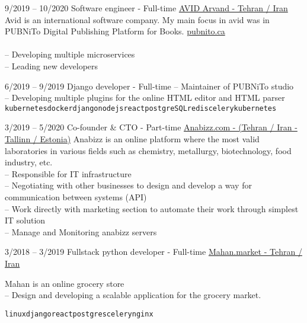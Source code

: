 \documentclass[9pt]{developercv}
\begin{document}
\begin{entrylist}
	\entry
	{9/2019 -- 10/2020}
	{Software engineer - Full-time}
	{
		\href{https://www.linkedin.com/company/avid-technology-development/}{AVID Arvand - Tehran / Iran}}
	{ Avid is an international software company. My main focus in avid was in PUBNiTo Digital Publishing Platform for Books.	 \href{https://pubnito.ca/}{pubnito.ca}\\ \\
		-- Developing multiple microservices \\
		-- Leading new developers }
\end{entrylist}
\begin{entrylist}
	\entry
	{6/2019 -- 9/2019}
	{Django developer - Full-time}
	{ }
	{-- Maintainer of PUBNiTo studio \\
		-- Developing multiple plugins for the online HTML editor and HTML parser  \\

		\texttt{kubernetes}\slashsep\texttt{docker}\slashsep\texttt{django}\slashsep\texttt{nodejs}\slashsep\texttt{react}\slashsep\texttt{postgreSQL}\slashsep\texttt{redis}\slashsep\texttt{celery}\slashsep\texttt{kubernetes}}
\end{entrylist}
\begin{entrylist}
	\entry
	{3/2019 -- 5/2020}
	{Co-founder \& CTO - Part-time}
	{\href{https://www.e-krediidiinfo.ee/16152752-ANABIZZ OÜ}{Anabizz.com - (Tehran / Iran - Tallinn / Estonia)}}
	{Anabizz is an online platform where the most valid laboratories in various fields such as chemistry, metallurgy, biotechnology, food industry, etc. \\
		-- Responsible for IT infrastructure  \\
		-- Negotiating with other businesses to design and develop a way for communication between systems (API) \\
		-- Work directly with marketing section to automate their work through simplest IT solution \\
		-- Manage and Monitoring anabizz servers \\
	}
\end{entrylist}

\begin{entrylist}
	\entry
	{3/2018 -- 3/2019}
	{Fullstack python developer - Full-time}
	{\href{https://mahan.market/}{Mahan.market - Tehran / Iran}}
	{Mahan is an online grocery store \\
		-- Design and developing a scalable application for the grocery market.

		\texttt{linux}\slashsep\texttt{django}\slashsep\texttt{react}\slashsep\texttt{postgres}\slashsep\texttt{celery}\slashsep\texttt{nginx}}
\end{entrylist}
\end{document}
